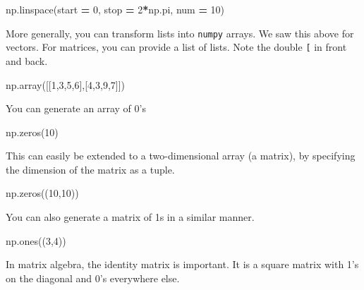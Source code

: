 \documentclass[
  letterpaper,
]{scrbook}
\newenvironment{Shaded}{\begin{snugshade}}{\end{snugshade}}
\newcommand{\DecValTok}[1]{\textcolor[rgb]{0.00,0.00,0.81}{#1}}
\newcommand{\NormalTok}[1]{#1}
\newcommand{\OperatorTok}[1]{\textcolor[rgb]{0.81,0.36,0.00}{\textbf{#1}}}
\begin{document}
\begin{Shaded}
\begin{Highlighting}[]
\NormalTok{np.linspace(start }\OperatorTok{=} \DecValTok{0}\NormalTok{, stop }\OperatorTok{=} \DecValTok{2}\OperatorTok{*}\NormalTok{np.pi, num }\OperatorTok{=} \DecValTok{10}\NormalTok{)}
\end{Highlighting}
\end{Shaded}

More generally, you can transform lists into \texttt{numpy} arrays. We saw this above for vectors. For matrices, you can provide a list of lists. Note the double \texttt{{[}} in front and back.

\begin{Shaded}
\begin{Highlighting}[]
\NormalTok{np.array([[}\DecValTok{1}\NormalTok{,}\DecValTok{3}\NormalTok{,}\DecValTok{5}\NormalTok{,}\DecValTok{6}\NormalTok{],[}\DecValTok{4}\NormalTok{,}\DecValTok{3}\NormalTok{,}\DecValTok{9}\NormalTok{,}\DecValTok{7}\NormalTok{]])}
\end{Highlighting}
\end{Shaded}

You can generate an array of 0's

\begin{Shaded}
\begin{Highlighting}[]
\NormalTok{np.zeros(}\DecValTok{10}\NormalTok{)}
\end{Highlighting}
\end{Shaded}

This can easily be extended to a two-dimensional array (a matrix), by specifying the dimension of the matrix as a tuple.

\begin{Shaded}
\begin{Highlighting}[]
\NormalTok{np.zeros((}\DecValTok{10}\NormalTok{,}\DecValTok{10}\NormalTok{))}
\end{Highlighting}
\end{Shaded}

You can also generate a matrix of 1s in a similar manner.

\begin{Shaded}
\begin{Highlighting}[]
\NormalTok{np.ones((}\DecValTok{3}\NormalTok{,}\DecValTok{4}\NormalTok{))}
\end{Highlighting}
\end{Shaded}

In matrix algebra, the identity matrix is important. It is a square matrix with 1's on the diagonal and 0's everywhere else.
\end{document}
